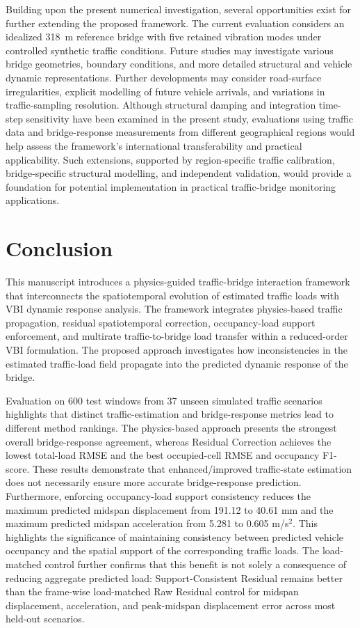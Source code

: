 \documentclass[journal]{IEEEtran}
\begin{document}
Building upon the present numerical investigation, several opportunities exist for further extending the proposed framework. The current evaluation considers an idealized 318~m reference bridge with five retained vibration modes under controlled synthetic traffic conditions. Future studies may investigate various bridge geometries, boundary conditions, and more detailed structural and vehicle dynamic representations. Further developments may consider road-surface irregularities, explicit modelling of future vehicle arrivals, and variations in traffic-sampling resolution. Although structural damping and integration time-step sensitivity have been examined in the present study, evaluations using traffic data and bridge-response measurements from different geographical regions would help assess the framework's international transferability and practical applicability. Such extensions, supported by region-specific traffic calibration, bridge-specific structural modelling, and independent validation, would provide a foundation for potential implementation in practical traffic-bridge monitoring applications.


\section{Conclusion}

This manuscript introduces a physics-guided traffic-bridge interaction framework that interconnects the spatiotemporal evolution of estimated traffic loads with VBI dynamic response analysis. The framework integrates physics-based traffic propagation, residual spatiotemporal correction, occupancy-load support enforcement, and multirate traffic-to-bridge load transfer within a reduced-order VBI formulation. The proposed approach investigates how inconsistencies in the estimated traffic-load field propagate into the predicted dynamic response of the bridge.

Evaluation on 600 test windows from 37 unseen simulated traffic scenarios highlights that distinct traffic-estimation and bridge-response metrics lead to different method rankings. The physics-based approach presents the strongest overall bridge-response agreement, whereas Residual Correction achieves the lowest total-load RMSE and the best occupied-cell RMSE and occupancy F1-score. These results demonstrate that enhanced/improved traffic-state estimation does not necessarily ensure more accurate bridge-response prediction. Furthermore, enforcing occupancy-load support consistency reduces the maximum predicted midspan displacement from 191.12 to 40.61 mm and the maximum predicted midspan acceleration from 5.281 to 0.605 m/s$^2$. This highlights the significance of maintaining consistency between predicted vehicle occupancy and the spatial support of the corresponding traffic loads. The load-matched control further confirms that this benefit is not solely a consequence of reducing aggregate predicted load: Support-Consistent Residual remains better than the frame-wise load-matched Raw Residual control for midspan displacement, acceleration, and peak-midspan displacement error across most held-out scenarios.
\end{document}
